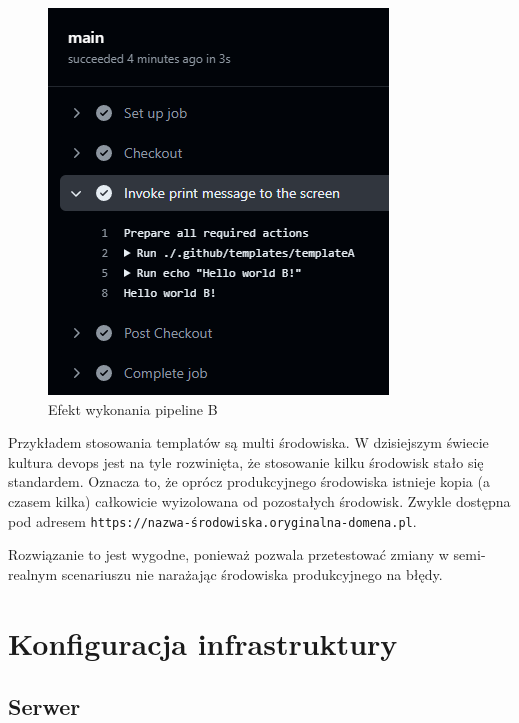 \documentclass{article}
\begin{document}
\begin{figure}[H]
\begin{minipage}[b]{0.45\textwidth}
        \centering
        \includegraphics[width=\linewidth]{testPipelinesPipelineB.png}
        \caption{Efekt wykonania pipeline B}
        \label{fig:enter-label-b}
    \end{minipage}
\end{figure}

Przykładem stosowania templatów są multi środowiska. W dzisiejszym świecie kultura devops jest na tyle rozwinięta, że stosowanie kilku środowisk stało się standardem. Oznacza to, że oprócz produkcyjnego środowiska istnieje kopia (a czasem kilka) całkowicie wyizolowana od pozostałych środowisk. Zwykle dostępna pod adresem \lstinline|https://nazwa-środowiska.oryginalna-domena.pl|.

Rozwiązanie to jest wygodne, ponieważ pozwala przetestować zmiany w semi-realnym scenariuszu nie narażając środowiska produkcyjnego na błędy.

\section{Konfiguracja infrastruktury}

\subsection{Serwer}
\end{document}
